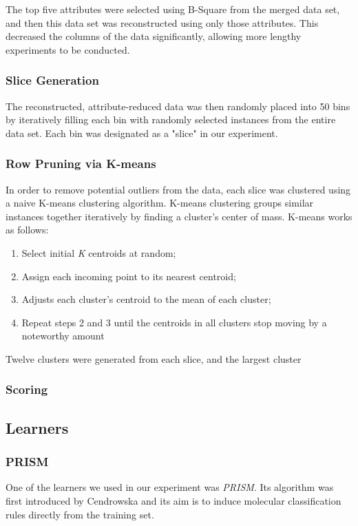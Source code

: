 \documentclass{sig-alternate}
\begin{document}
The top five attributes were selected using B-Square from the merged data set, and then this data set was reconstructed using only those attributes. This decreased the columns of the data significantly, allowing more lengthy experiments to be conducted.

\subsubsection{Slice Generation}

The reconstructed, attribute-reduced data was then randomly placed into 50 bins by iteratively filling each bin with randomly selected instances from the entire data set. Each bin was designated as a "slice" in our experiment.

\subsubsection{Row Pruning via K-means}

In order to remove potential outliers from the data, each slice was clustered using a naive K-means clustering algorithm. K-means clustering groups similar instances together iteratively by finding a cluster's center of mass. K-means works as follows:

\begin{centering}
\begin{enumerate}
\item{Select initial {\em K} centroids at random;}
\item{Assign each incoming point to its nearest centroid;}
\item{Adjusts each cluster's centroid to the mean of each cluster;}
\item{Repeat steps 2 and 3 until the centroids in all clusters stop moving by a noteworthy amount}
\end{enumerate}
\end{centering}

Twelve clusters were generated from each slice, and the largest cluster

\subsubsection{Scoring }
\subsection{Learners}
\subsubsection{PRISM}
One of the learners we used in our experiment was {\em PRISM}. Its algorithm was first introduced by Cendrowska and its aim is to induce molecular classification rules directly from the training set.
\end{document}
